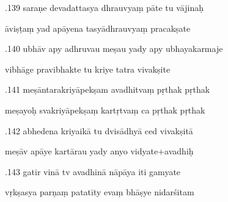 \documentclass[article,12pt,a4paper]{memoir}%
\newcounter{parCount}
\begin{document}
	  
	  \pstart {}.139 saraṇe devadattasya dhrauvyaṃ pāte tu vājinaḥ 
	{}
	\pend%
      

	  
	  \pstart \leavevmode%
	āviṣṭaṃ yad apāyena tasyādhrauvyaṃ pracakṣate 
	{}
	\pend%
      

	  
	  \pstart {}.140 ubhāv apy adhruvau meṣau yady apy ubhayakarmaje 
	{}
	\pend%
      

	  
	  \pstart \leavevmode%
	vibhāge pravibhakte tu kriye tatra vivakṣite 
	{}
	\pend%
      

	  
	  \pstart {}.141 meṣāntarakriyāpekṣam avadhitvaṃ pṛthak pṛthak 
	{}
	\pend%
      

	  
	  \pstart \leavevmode%
	meṣayoḥ svakriyāpekṣaṃ kartṛtvaṃ ca pṛthak pṛthak 
	{}
	\pend%
      

	  
	  \pstart {}.142 abhedena kriyaikā tu dvisādhyā ced vivakṣitā 
	{}
	\pend%
      

	  
	  \pstart \leavevmode%
	meṣāv apāye kartārau yady anyo vidyate+avadhiḥ 
	{}
	\pend%
      

	  
	  \pstart {}.143 gatir vinā tv avadhinā nāpāya iti gamyate 
	{}
	\pend%
      

	  
	  \pstart \leavevmode%
	vṛkṣasya parṇaṃ patatīty evaṃ bhāṣye nidarśitam 
	{}
	\pend%
      
\end{document}
